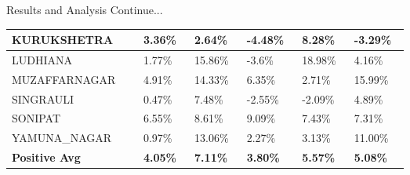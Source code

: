 \documentclass[12pt, aspectratio=169]{beamer}
\begin{document}
\begin{frame}{Results and Analysis \tiny{Continue...}}
\begin{table}
\begin{tabular}{ |p{0.19\linewidth} |p{0.08\linewidth} |p{0.08\linewidth} |p{0.08\linewidth} | p{0.08\linewidth} |p{0.08\linewidth}|}
       \scriptsize KURUKSHETRA & \scriptsize  3.36\% & \scriptsize  2.64\% & \scriptsize  -4.48\% & \scriptsize  8.28\% & \scriptsize  -3.29\% \\ \hline
       \scriptsize LUDHIANA & \scriptsize  1.77\% & \scriptsize  15.86\% & \scriptsize  -3.6\% & \scriptsize  18.98\% & \scriptsize  4.16\% \\ \hline
       \scriptsize MUZAFFARNAGAR & \scriptsize  4.91\% & \scriptsize  14.33\% & \scriptsize  6.35\% & \scriptsize  2.71\% & \scriptsize  15.99\% \\ \hline
       \scriptsize SINGRAULI & \scriptsize  0.47\% & \scriptsize  7.48\% & \scriptsize  -2.55\% & \scriptsize  -2.09\% & \scriptsize  4.89\% \\ \hline
       \scriptsize SONIPAT & \scriptsize  6.55\% & \scriptsize  8.61\% & \scriptsize  9.09\% & \scriptsize  7.43\% & \scriptsize  7.31\% \\ \hline
       \scriptsize YAMUNA\_NAGAR & \scriptsize  0.97\% & \scriptsize  13.06\% & \scriptsize  2.27\% & \scriptsize  3.13\% & \scriptsize  11.00\% \\ \hline 
       \scriptsize \textbf{Positive Avg}  & \scriptsize  \textbf{4.05\%} & \scriptsize  \textbf{7.11\%}& \scriptsize  \textbf{3.80\%} & \scriptsize  \textbf{5.57\%} & \scriptsize  \textbf{5.08\%} \\ \hline
        \end{tabular}
    \end{table}
\end{frame}
\end{document}
